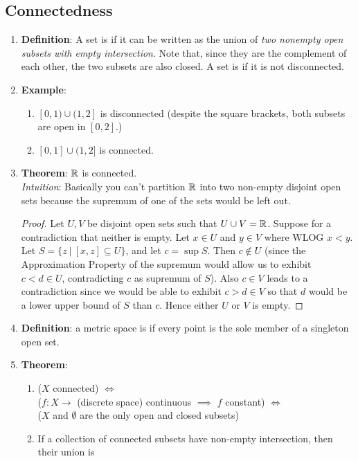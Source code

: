 \subsection{Connectedness}
\begin{enumerate}
\item {\bf Definition}: A set is  if it can be written as the union of {\it two
    nonempty open subsets with empty intersection}. Note that, since they are the complement of
  each other, the two subsets are also closed.  A set is  if it is not
  disconnected.
\item {\bf Example}:
  \begin{enumerate}[label=(\roman*)]
  \item $[0, 1) \cup (1, 2]$ is disconnected (despite the square brackets, both subsets are open in
    $[0, 2]$.)
  \item $[0, 1] \cup (1, 2]$ is connected.
  \end{enumerate}
\item {\bf Theorem}: $\mathbb{R}$ is connected.\\
  {\it Intuition}: Basically you can't partition $\mathbb{R}$ into two non-empty disjoint open sets because
  the supremum of one of the sets would be left out.
  \begin{proof}
    Let $U, V$ be disjoint open sets such that $U \cup V = \mathbb{R}$. Suppose for a contradiction that
    neither is empty. Let $x \in U$ and $y \in V$ where WLOG $x < y$. Let
    $S = \{z ~|~ [x, z] \subseteq U\}$, and let $c = \sup S$. Then $c \notin U$ (since the
    Approximation Property of the supremum would allow us to exhibit $c < d \in U$, contradicting
    $c$ as supremum of $S$). Also $c \in V$ leads to a contradiction since we would be able to
    exhibit $c > d \in V$ so that $d$ would be a lower upper bound of $S$ than $c$. Hence either
    $U$ or $V$ is empty.
  \end{proof}
\item {\bf Definition}: a metric space is  if every point is the sole member of a
  singleton open set.
\item {\bf Theorem}:
  \begin{enumerate}[label=(\roman*)]
  \item
    ($X$ connected) $\iff$\\
    ($f:X \to$ (discrete space) continuous $\implies$ $f$ constant) $\iff$\\
    ($X$ and $\emptyset$ are the only open and closed subsets)
  \item If a collection of connected subsets have non-empty intersection, then their union is

\end{enumerate}
\end{enumerate}
